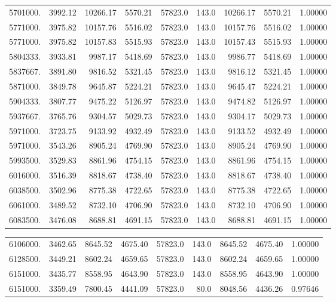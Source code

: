 {\begin{tabular}{rrrrrrrrr}
5701000. & 3992.12& 10266.17 & 5570.21 & 57823.0   & 143.0& 10266.17 & 5570.21 & 1.00000 \\
5771000. & 3975.82& 10157.76 & 5516.02 & 57823.0   & 143.0& 10157.76 & 5516.02 & 1.00000 \\
5771000. & 3975.82& 10157.83 & 5515.93 & 57823.0   & 143.0& 10157.43 & 5515.93 & 1.00000 \\
5804333. & 3933.81 & 9987.17 & 5418.69 & 57823.0   & 143.0 & 9986.77 & 5418.69 & 1.00000 \\
5837667. & 3891.80 & 9816.52 & 5321.45 & 57823.0   & 143.0 & 9816.12 & 5321.45 & 1.00000 \\
5871000. & 3849.78 & 9645.87 & 5224.21 & 57823.0   & 143.0 & 9645.47 & 5224.21 & 1.00000 \\
5904333. & 3807.77 & 9475.22 & 5126.97 & 57823.0   & 143.0 & 9474.82 & 5126.97 & 1.00000 \\
5937667. & 3765.76 & 9304.57 & 5029.73 & 57823.0   & 143.0 & 9304.17 & 5029.73 & 1.00000 \\
5971000. & 3723.75 & 9133.92 & 4932.49 & 57823.0   & 143.0 & 9133.52 & 4932.49 & 1.00000 \\
5971000. & 3543.26 & 8905.24 & 4769.90 & 57823.0   & 143.0 & 8905.24 & 4769.90 & 1.00000 \\
5993500. & 3529.83 & 8861.96 & 4754.15 & 57823.0   & 143.0 & 8861.96 & 4754.15 & 1.00000 \\
6016000. & 3516.39 & 8818.67 & 4738.40 & 57823.0   & 143.0 & 8818.67 & 4738.40 & 1.00000 \\
6038500. & 3502.96 & 8775.38 & 4722.65 & 57823.0   & 143.0 & 8775.38 & 4722.65 & 1.00000 \\
6061000. & 3489.52 & 8732.10 & 4706.90 & 57823.0   & 143.0 & 8732.10 & 4706.90 & 1.00000 \\
6083500. & 3476.08 & 8688.81 & 4691.15 & 57823.0   & 143.0 & 8688.81 & 4691.15 & 1.00000 \\
\end{tabular}
\newpage
\begin{tabular}{rrrrrrrrr} \\
6106000. & 3462.65 & 8645.52 & 4675.40 & 57823.0   & 143.0 & 8645.52 & 4675.40 & 1.00000 \\
6128500. & 3449.21 & 8602.24 & 4659.65 & 57823.0   & 143.0 & 8602.24 & 4659.65 & 1.00000 \\
6151000. & 3435.77 & 8558.95 & 4643.90 & 57823.0   & 143.0 & 8558.95 & 4643.90 & 1.00000 \\
6151000. & 3359.49 & 7800.45 & 4441.09 & 57823.0    & 80.0 & 8048.56 & 4436.26 & 0.97646 \\

\end{tabular}}
